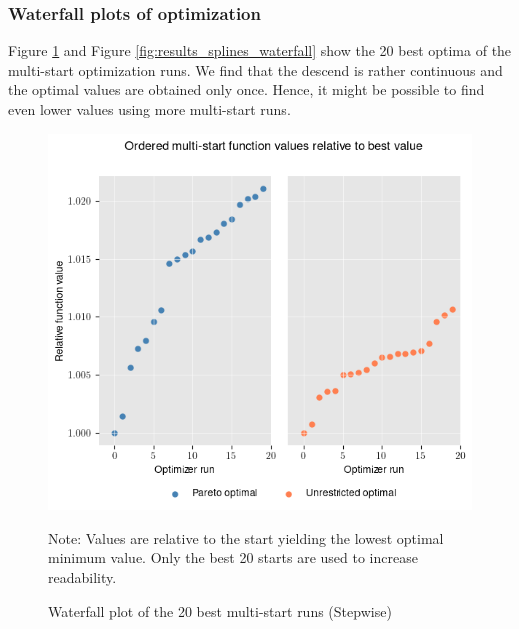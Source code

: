 \subsubsection{Waterfall plots of optimization}
\label{A:waterfall}
Figure \ref{fig:results_piecewise_waterfall} and Figure \ref{fig:results_splines_waterfall} show the 20 best optima of the multi-start optimization runs. We find that the descend is rather continuous and the optimal values are obtained only once. Hence, it might be possible to find even lower values using more multi-start runs.
\begin{figure}[h!]
\centering
\includegraphics[scale=0.53]{images/piecewise_waterfall.png}\\
\begin{flushleft}
\scriptsize{Note:} Values are relative to the start yielding the lowest optimal minimum value. Only the best 20 starts are used to increase readability. 
\end{flushleft}
\caption{Waterfall plot of the 20 best multi-start runs (Stepwise)}
\label{fig:results_piecewise_waterfall}
\end{figure}


